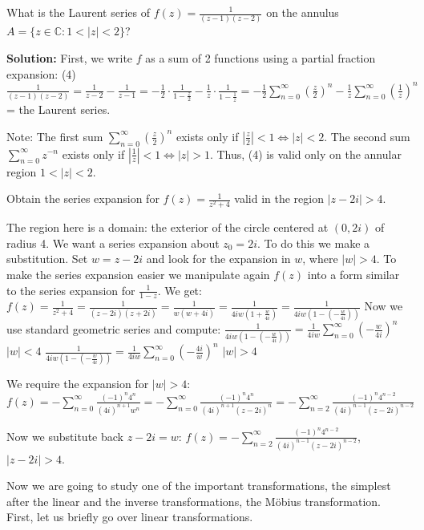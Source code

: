 \documentclass[12pt]{article}
\begin{document}
\begin{example}
What is the Laurent series of $f(z) = \frac{1}{(z-1)(z-2)}$ on the annulus $A = \{z \in \mathbb{C}: 1 < |z| < 2\}$?

\textbf{Solution:} First, we write $f$ as a sum of 2 functions using a partial fraction expansion:
(4) $\frac{1}{(z-1)(z-2)} = \frac{1}{z-2} - \frac{1}{z-1} = -\frac{1}{2} \cdot \frac{1}{1-\frac{z}{2}} - \frac{1}{z} \cdot \frac{1}{1-\frac{1}{z}} = -\frac{1}{2} \sum_{n=0}^\infty (\frac{z}{2})^n - \frac{1}{z} \sum_{n=0}^\infty (\frac{1}{z})^n$ = the Laurent series.

Note: The first sum $\sum_{n=0}^\infty (\frac{z}{2})^n$ exists only if $|\frac{z}{2}| < 1 \iff |z| < 2$.
The second sum $\sum_{n=0}^\infty z^{-n}$ exists only if $|\frac{1}{z}| < 1 \iff |z| > 1$.
Thus, (4) is valid only on the annular region $1 < |z| < 2$.
\end{example}

\begin{example}
Obtain the series expansion for $f(z) = \frac{1}{z^2 + 4}$ valid in the region $|z-2i| > 4$.

The region here is a domain: the exterior of the circle centered at $(0, 2i)$ of radius 4.
We want a series expansion about $z_0 = 2i$. To do this we make a substitution.
Set $w = z-2i$ and look for the expansion in $w$, where $|w| > 4$. To make the series expansion easier we manipulate again $f(z)$ into a form similar to the series expansion for $\frac{1}{1-z}$. We get:
$f(z) = \frac{1}{z^2+4} = \frac{1}{(z-2i)(z+2i)} = \frac{1}{w(w+4i)} = \frac{1}{4iw(1+\frac{w}{4i})} = \frac{1}{4iw(1-(-\frac{w}{4i}))}$
Now we use standard geometric series and compute:
$\frac{1}{4iw(1-(-\frac{w}{4i}))} = \frac{1}{4iw} \sum_{n=0}^\infty (-\frac{w}{4i})^n$ $|w| < 4$
$\frac{1}{4iw(1-(-\frac{w}{4i}))} = \frac{1}{4iw} \sum_{n=0}^\infty (-\frac{4i}{w})^n$ $|w| > 4$
\end{example}
We require the expansion for $|w| > 4$:
$f(z) = -\sum_{n=0}^\infty \frac{(-1)^n 4^n}{(4i)^{n+1}w^n} = -\sum_{n=0}^\infty \frac{(-1)^n 4^n}{(4i)^{n+1}(z-2i)^n} = -\sum_{n=2}^\infty \frac{(-1)^n 4^{n-2}}{(4i)^{n-1}(z-2i)^{n-2}}$

Now we substitute back $z-2i = w$: $f(z) = -\sum_{n=2}^\infty \frac{(-1)^n 4^{n-2}}{(4i)^{n-1}(z-2i)^{n-2}}$, $|z-2i| > 4$.

Now we are going to study one of the important transformations, the simplest after the linear and the inverse transformations, the Möbius transformation. First, let us briefly go over linear transformations.
\end{document}
